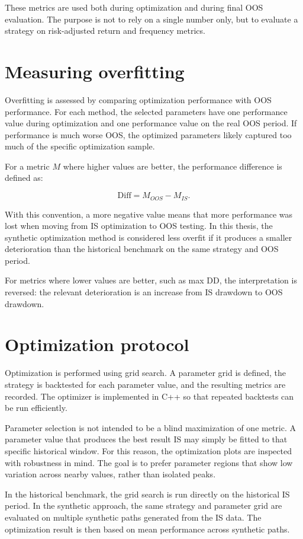 These metrics are used both during optimization and during final OOS evaluation. The purpose is not
to rely on a single number only, but to evaluate a strategy on risk-adjusted return and frequency
metrics.

\section{Measuring overfitting}

Overfitting is assessed by comparing optimization performance with OOS performance. For each method,
the selected parameters have one performance value during optimization and one performance value on
the real OOS period. If performance is much worse OOS, the optimized parameters likely captured too
much of the specific optimization sample.

For a metric \(M\) where higher values are better, the performance difference is defined as:

\[
\text{Diff} = M_{OOS} - M_{IS}.
\]

With this convention, a more negative value means that more performance was lost when moving from IS
optimization to OOS testing. In this thesis, the synthetic optimization method is considered less
overfit if it produces a smaller deterioration than the historical benchmark on the same strategy and
OOS period.

For metrics where lower values are better, such as max DD, the interpretation is reversed: the relevant
deterioration is an increase from IS drawdown to OOS drawdown.

\section{Optimization protocol}

Optimization is performed using grid search. A parameter grid is defined, the strategy is backtested
for each parameter value, and the resulting metrics are recorded. The optimizer is implemented in
C++ so that repeated backtests can be run efficiently.

Parameter selection is not intended to be a blind maximization of one metric. A parameter value that
produces the best result IS may simply be fitted to that specific historical window. For this
reason, the optimization plots are inspected with robustness in mind. The goal is to prefer
parameter regions that show low variation across nearby values, rather than isolated peaks.

In the historical benchmark, the grid search is run directly on the historical IS period. In the
synthetic approach, the same strategy and parameter grid are evaluated on multiple synthetic paths
generated from the IS data. The optimization result is then based on mean performance across
synthetic paths.

